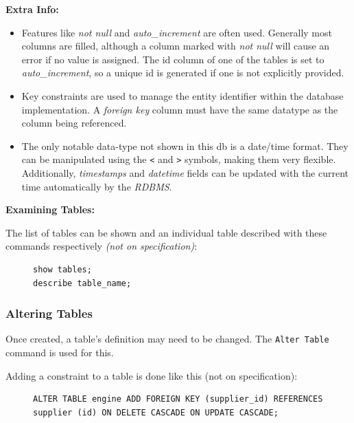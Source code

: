 \documentclass[10pt]{article}
\begin{document}
\textbf{Extra Info:}

\begin{itemize}
\item Features like \emph{not null} and \emph{auto\_increment} are often used. Generally most columns are filled, although a column marked with \emph{not null} will cause an error if no value is assigned. The id column of one of the tables is set to \emph{auto\_increment}, so a unique id is generated if one is not explicitly provided.
\item Key constraints are used to manage the entity identifier within the database implementation. A \emph{foreign key} column must have the same datatype as the column being referenced.
\item The only notable data-type not shown in this db is a date/time format. They can be manipulated using the \texttt{<} and \texttt{>} symbols, making them very flexible. Additionally, \emph{timestamps} and \emph{datetime} fields can be updated with the current time automatically by the \emph{RDBMS}.
\end{itemize}

\textbf{Examining Tables:}

The list of tables can be shown and an individual table described with these commands respectively \emph{(not on specification)}:

\begin{figure}[H]
\begin{verbatim}
show tables;
describe table_name;
\end{verbatim}
\end{figure}

\subsubsection{Altering Tables}
\label{sec:org76d6433}

Once created, a table's definition may need to be changed. The \texttt{Alter Table} command is used for this.

Adding a constraint to a table is done like this (not on specification):

\begin{figure}[H]
\begin{verbatim}
ALTER TABLE engine ADD FOREIGN KEY (supplier_id) REFERENCES supplier (id) ON DELETE CASCADE ON UPDATE CASCADE;
\end{verbatim}
\end{figure}
\end{document}
